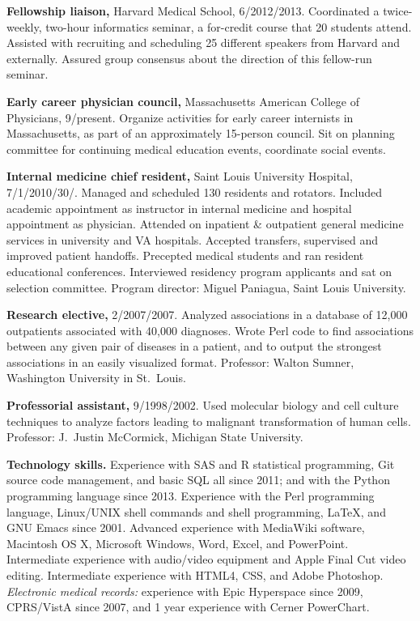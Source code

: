 \documentclass[12pt]{article}
\begin{document}
\textbf{Fellowship liaison,} Harvard Medical School,
6/2012/2013. Coordinated a twice-week\-ly, two-hour informatics
seminar, a for-credit course that 20 students attend. Assisted with
recruiting and scheduling 25 different speakers from Harvard and
externally. Assured group consensus about the direction of this
fellow-run seminar.

\textbf{Early career physician council,} Massachusetts American
College of Physicians,
9/\ndash{}\linebreak[0]pres\-ent. Organize activities
for early career internists in Massachusetts, as part of an
approximately 15-person council. Sit on planning committee for
continuing medical education events, coordinate social events.

\textbf{Internal medicine chief resident,} Saint Louis University
Hospital, 7/1/2010\ndash{}/30/. Managed
and scheduled 130 residents and rotators. Included academic
appointment as instructor in internal medicine and hospital
appointment as physician. Attended on inpatient \& outpatient general
medicine services in university and VA hospitals. Accepted transfers,
supervised and improved patient handoffs. Precepted medical students
and ran resident educational conferences. Interviewed residency
program applicants and sat on selection committee. Program director:
Miguel Paniagua, Saint Louis University.

\textbf{Research elective,} 2/2007/2007. Analyzed associations
in a database of 12,000 outpatients associated with 40,000 diagnoses.
Wrote Perl code to find associations between any given pair of
diseases in a patient, and to output the strongest associations in an
easily visualized format. Professor: Walton Sumner, Washington
University in St.\ Louis.

\textbf{Professorial assistant,} 9/1998/2002. Used molecular
biology and cell culture techniques to analyze factors leading to
malignant transformation of human cells. Professor: J.\ Justin
McCormick, Michigan State University.

\textbf{Technology skills.} Experience with SAS and R statistical
programming, Git source code management, and basic SQL all since 2011;
and with the Python programming language since 2013.
Experience with the Perl programming language, Linux/UNIX shell
commands and shell programming, \LaTeX, and GNU Emacs since 2001.
Advanced experience with MediaWiki software, Macintosh OS X, Microsoft
Windows, Word, Excel, and PowerPoint. Intermediate experience with
audio/video equipment and Apple Final Cut video editing. Intermediate
experience with HTML4, CSS, and Adobe Photoshop. \emph{Electronic
  medical records:} experience with Epic Hyperspace since 2009,
CPRS/VistA since 2007, and 1 year experience with Cerner PowerChart.
\end{document}
